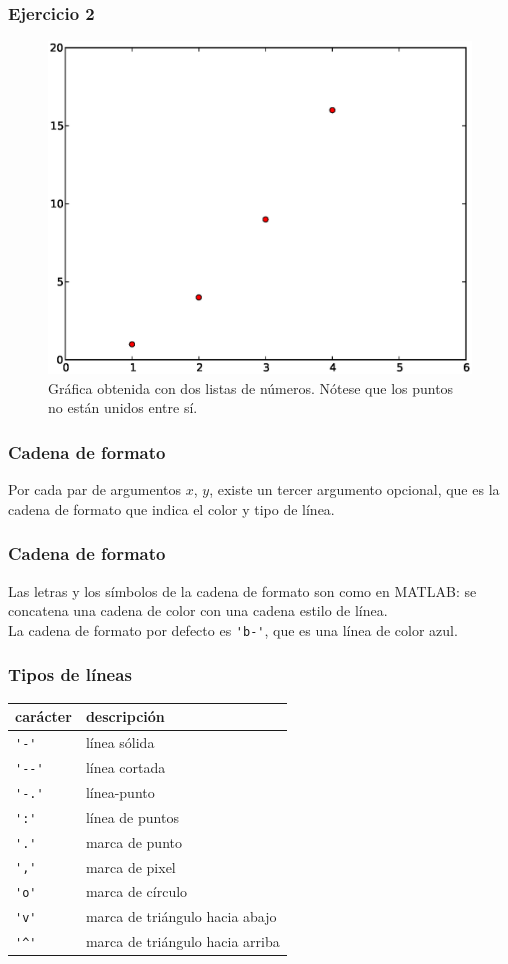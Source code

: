 \begin{frame}
\frametitle{Ejercicio 2}
\begin{figure}
	\centering
	\includegraphics[scale=0.35]{Imagenes/plotEjercicio2.eps}
	\caption{Gráfica obtenida con dos listas de números. Nótese que los puntos no están unidos entre sí.}
\end{figure}
\end{frame}
\begin{frame}[fragile]
\frametitle{Cadena de formato}
Por cada par de argumentos $x$, $y$, existe un tercer argumento opcional, que es la cadena de formato que indica el color y tipo de línea.
\end{frame}
\begin{frame}[fragile]
\frametitle{Cadena de formato}
Las letras y los símbolos de la cadena de formato son como en MATLAB: se concatena una cadena de color con una cadena estilo de línea.
\\
\bigskip
La cadena de formato por defecto es \verb|'b-'|, que es una línea de color azul.
\end{frame}
\begin{frame}[fragile]
\frametitle{Tipos de líneas}
\fontsize{10}{10}\selectfont
\begin{tabular}{l | l}
carácter & descripción \\ \hline
\verb|'-'|	& línea sólida \\ \hline
\verb|'--'| & línea cortada \\ \hline
\verb|'-.'| & línea-punto \\ \hline
\verb|':'|	& línea de puntos \\ \hline
\verb|'.'|	& marca de punto \\ \hline
\verb|','|	& marca de pixel \\ \hline
\verb|'o'|	& marca de círculo \\ \hline
\verb|'v'|	& marca de triángulo hacia abajo \\ \hline
\verb|'^'|	& marca de triángulo hacia arriba
\end{tabular}
\end{frame}
